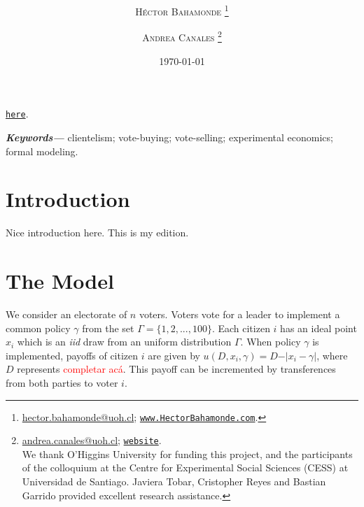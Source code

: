 \documentclass[onesided]{article}\usepackage[]{graphicx}\usepackage[]{color}
\title{\vspace{-15mm}\fontsize{18pt}{7pt}\selectfont\textbf{\unskip}} %
\author[1]{

\textsc{H\'ector Bahamonde}
\thanks{\href{mailto:hector.bahamonde@uoh.cl}{hector.bahamonde@uoh.cl}; \href{http://www.hectorbahamonde.com}{\texttt{www.HectorBahamonde.com}}.}}
\author[2]{

\textsc{Andrea Canales}
\thanks{\href{mailto:andrea.canales@uoh.cl}{andrea.canales@uoh.cl}; 
\href{https://www.uoh.cl}{\texttt{website}}. \\
We thank O'Higgins University for funding this project, and the participants of the colloquium at the Centre for Experimental Social Sciences (CESS) at Universidad de Santiago. Javiera Tobar, Cristopher Reyes and Bastian Garrido provided excellent research assistance.}}
\affil[1]{Assistant Professor, O$'$Higgins University (Chile)}
\affil[2]{Postdoctoral Fellow, O$'$Higgins University (Chile)}
\date{\today}
\begin{document}


\setcounter{hyp}{0} %

\maketitle %








\begin{abstract}
\unskip
\end{abstract}

\hspace*{1.3cm}{\bf Please consider downloading the last version of the paper} \href{https://github.com/hbahamonde/Economic_Experiment_Vote_Selling/raw/master/Vote_Selling_Bahamonde_Canales_Paper.pdf}{\texttt{{\color{red}here}}}.

\providecommand{\keywords}[1]{\textbf{\textit{Keywords---}} #1} %
\keywords{clientelism; vote-buying; vote-selling; experimental economics; formal modeling.}



\clearpage
\newpage
{}
\setcounter{page}{1}


\section{Introduction}

Nice introduction here. This is my edition.

\section{The Model}
We consider an electorate of $n$ voters. Voters vote for a leader to implement a common policy $\gamma$ from the set $\Gamma=\{1,2,...,100\}$. Each citizen $i$ has an ideal point $x_i$ which is an \emph{iid} draw from an uniform distribution $\Gamma$. When policy $\gamma$ is implemented, payoffs of citizen $i$ are given by $u(D,x_i,\gamma)=D-\vert x_i-\gamma \vert$, where $D$ represents \textcolor{red}{completar ac\'a}. This payoff can be incremented by transferences from both parties to voter $i$.
\end{document}
